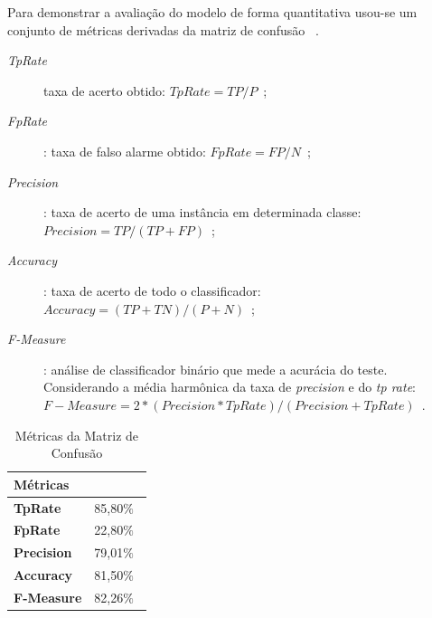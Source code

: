 Para demonstrar a avaliação do modelo de forma quantitativa usou-se um conjunto de métricas derivadas da matriz de confusão ~\cite{datamining2005}.
\begin{description}
	\item [\textit{TpRate}] taxa de acerto obtido: $ TpRate = TP/P $\ ;
	\item [\textit{FpRate}]: taxa de falso alarme obtido: $ FpRate = FP/N $\ ;
	\item [\textit{Precision}]: taxa de acerto de uma instância em determinada classe: $ Precision =  TP/(TP +FP) $\ ;
	\item [\textit{Accuracy}]: taxa de acerto de todo o classificador: $ Accuracy = (TP+TN)/(P+N) $\ ;
	\item [\textit{F-Measure}]: análise de classificador binário que mede a acurácia do teste. Considerando a média harmônica da taxa de \textit{precision} e do \textit{tp rate}: $ F-Measure = 2 * (Precision * TpRate)/(Precision + TpRate) $\ .
\end{description}

\begin{table}[!htbp]
\caption{Métricas da Matriz de Confusão}
\label{table:metricasmatrizconfusaosvm}
\centering
\begin{tabular}{|l|r|}
\hline
\multicolumn{2}{|l|}{\textbf{Métricas}} \\ \hline
\textbf{TpRate}                    & 85,80$\%$\                 \\ \hline
\textbf{FpRate}                    & 22,80$\%$\                \\ \hline
\textbf{Precision}                 & 79,01$\%$\                \\ \hline
\textbf{Accuracy}                  & 81,50$\%$\                \\ \hline
\textbf{F-Measure}                 & 82,26$\%$\                \\ \hline
\end{tabular}
\end{table}





